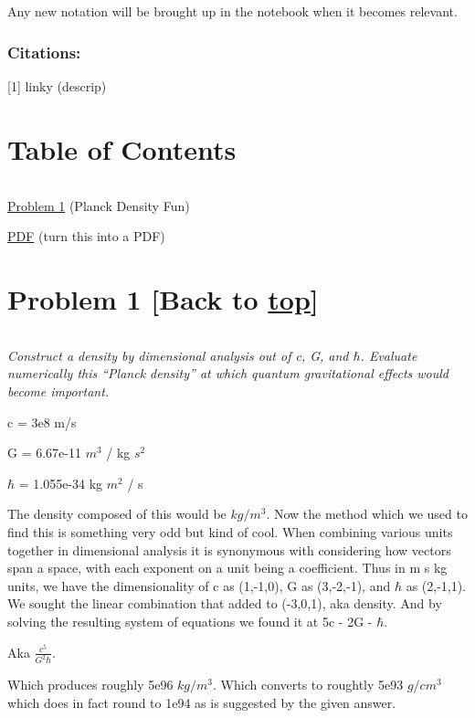 \documentclass[landscape,letterpaper,10pt,english]{article}
\begin{document}
Any new notation will be brought up in the notebook when it becomes
relevant.

\hypertarget{citations}{%
\subsubsection{Citations:}\label{citations}}

{[}1{]} linky (descrip)

    \hypertarget{table-of-contents}{%
\section{Table of Contents}\label{table-of-contents}}

\[\label{toc}\]

\hyperref[p1]{Problem 1} (Planck Density Fun)

\hyperref[latex_pdf_output]{PDF} (turn this into a PDF)

    \hypertarget{problem-1-back-to-top}{%
\section{\texorpdfstring{Problem 1 {[}Back to
\hyperref[toc]{top}{]}}{Problem 1 {[}Back to {]}}}\label{problem-1-back-to-top}}

\[\label{P1}\]

\emph{Construct a density by dimensional analysis out of c, G, and
\(\hbar\). Evaluate numerically this ``Planck density'' at which quantum
gravitational effects would become important.}

c = 3e8 m/s

G = 6.67e-11 \(m^3\) / kg \(s^2\)

\(\hbar\) = 1.055e-34 kg \(m^2\) / s

    The density composed of this would be \(kg / m^3\). Now the method which
we used to find this is something very odd but kind of cool. When
combining various units together in dimensional analysis it is
synonymous with considering how vectors span a space, with each exponent
on a unit being a coefficient. Thus in m s kg units, we have the
dimensionality of c as (1,-1,0), G as (3,-2,-1), and \(\hbar\) as
(2,-1,1). We sought the linear combination that added to (-3,0,1), aka
density. And by solving the resulting system of equations we found it at
5c - 2G - \(\hbar\).

Aka \(\frac{c^5}{G^2\hbar}\).

Which produces roughly 5e96 \(kg/m^3\). Which converts to roughtly 5e93
\(g/cm^3\) which does in fact round to 1e94 as is suggested by the given
answer.
\end{document}
